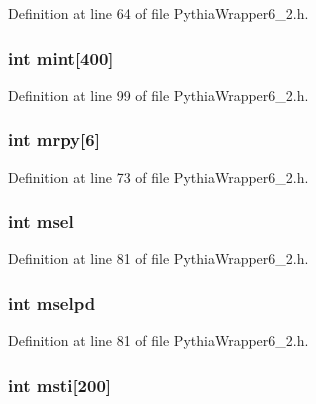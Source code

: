 Definition at line 64 of file Pythia\-Wrapper6\_\-2.h.
\subsubsection{\setlength{\rightskip}{0pt plus 5cm}int {\bf mint}[400]}\label{PythiaWrapper6__2_8h_79d56c63372bdf9b19fbb5fb47fe0c10}




Definition at line 99 of file Pythia\-Wrapper6\_\-2.h.
\subsubsection{\setlength{\rightskip}{0pt plus 5cm}int {\bf mrpy}[6]}\label{PythiaWrapper6__2_8h_ae3607e3caed79fa09cf79970779987a}




Definition at line 73 of file Pythia\-Wrapper6\_\-2.h.
\subsubsection{\setlength{\rightskip}{0pt plus 5cm}int {\bf msel}}\label{PythiaWrapper6__2_8h_88dabd3e5dcfeffa266684c49ed2c4af}




Definition at line 81 of file Pythia\-Wrapper6\_\-2.h.
\subsubsection{\setlength{\rightskip}{0pt plus 5cm}int {\bf mselpd}}\label{PythiaWrapper6__2_8h_ac07f9fe89ca7ddf1bcd298448498ee4}




Definition at line 81 of file Pythia\-Wrapper6\_\-2.h.
\subsubsection{\setlength{\rightskip}{0pt plus 5cm}int {\bf msti}[200]}\label{PythiaWrapper6__2_8h_e9eb72ec4bb6e88122395b4f2aa3950c}





